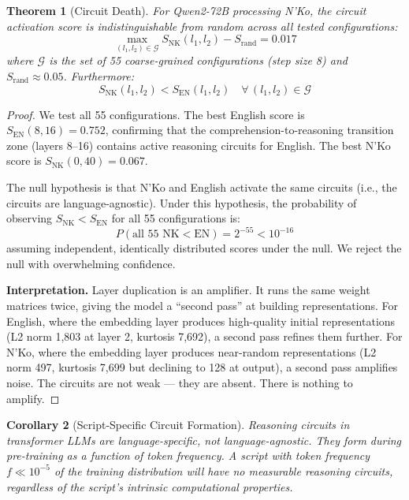 \documentclass[11pt]{article}
\newtheorem{theorem}{Theorem}
\newtheorem{corollary}[theorem]{Corollary}
\theoremstyle{remark}
\begin{document}
\begin{theorem}[Circuit Death]
For Qwen2-72B processing N'Ko, the circuit activation score is indistinguishable from random across all tested configurations:
$$\max_{(l_1, l_2) \in \mathcal{G}} S_{\text{NK}}(l_1, l_2) - S_{\text{rand}} = 0.017$$
where $\mathcal{G}$ is the set of 55 coarse-grained configurations (step size 8) and $S_{\text{rand}} \approx 0.05$. Furthermore:
$$S_{\text{NK}}(l_1, l_2) < S_{\text{EN}}(l_1, l_2) \quad \forall\, (l_1, l_2) \in \mathcal{G}$$
\end{theorem}

\begin{proof}
We test all 55 configurations. The best English score is $S_{\text{EN}}(8, 16) = 0.752$, confirming that the comprehension-to-reasoning transition zone (layers 8--16) contains active reasoning circuits for English. The best N'Ko score is $S_{\text{NK}}(0, 40) = 0.067$.

The null hypothesis is that N'Ko and English activate the same circuits (i.e., the circuits are language-agnostic). Under this hypothesis, the probability of observing $S_{\text{NK}} < S_{\text{EN}}$ for all 55 configurations is:
\begin{equation}
P(\text{all 55 NK} < \text{EN}) = 2^{-55} < 10^{-16}
\end{equation}
assuming independent, identically distributed scores under the null. We reject the null with overwhelming confidence.

\textbf{Interpretation.} Layer duplication is an amplifier. It runs the same weight matrices twice, giving the model a ``second pass'' at building representations. For English, where the embedding layer produces high-quality initial representations (L2 norm 1,803 at layer 2, kurtosis 7,692), a second pass refines them further. For N'Ko, where the embedding layer produces near-random representations (L2 norm 497, kurtosis 7,699 but declining to 128 at output), a second pass amplifies noise. The circuits are not weak --- they are absent. There is nothing to amplify.
\end{proof}

\begin{corollary}[Script-Specific Circuit Formation]
Reasoning circuits in transformer LLMs are language-specific, not language-agnostic. They form during pre-training as a function of token frequency. A script with token frequency $f \ll 10^{-5}$ of the training distribution will have no measurable reasoning circuits, regardless of the script's intrinsic computational properties.
\end{corollary}
\end{document}
